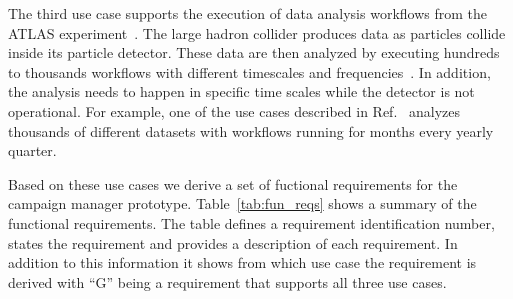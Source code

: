 The third use case supports the execution of data analysis workflows from the ATLAS experiment~\cite{atlas}.
The large hadron collider produces data as particles collide inside its particle detector.
These data are then analyzed by executing hundreds to thousands workflows with different timescales and frequencies~\cite{borodin2015big}.
In addition, the analysis needs to happen in specific time scales while the detector is not operational.
For example, one of the use cases described in Ref.~\cite{borodin2015big} analyzes thousands of different datasets with workflows running for months every yearly quarter.

Based on these use cases we derive a set of fuctional requirements for the campaign manager prototype. 
Table~\ref{tab:fun_reqs} shows a summary of the functional requirements.
The table defines a requirement identification number, states the requirement and provides a description of each requirement.
In addition to this information it shows from which use case the requirement is derived with ``G'' being a requirement that supports all three use cases. 

